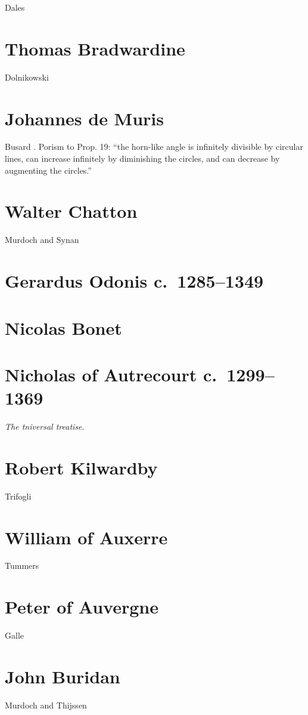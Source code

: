 \documentclass{amsart}
\theoremstyle{definition}
\begin{document}
Dales \cite{dales1984}

\section{Thomas Bradwardine}
Dolnikowski \cite{dolnikowski}


\section{Johannes de Muris}
Busard \cite[p.~35]{demuris}. Porism to Prop. 19: ``the horn-like
angle is infinitely divisible by circular lines, can increase infinitely
by diminishing the circles, and can decrease by augmenting
the circles.''

\section{Walter Chatton}
Murdoch and Synan \cite{synan}

\section{Gerardus Odonis c.~1285--1349}


\section{Nicolas Bonet}

\section{Nicholas of Autrecourt c.~1299--1369}
{\em The tniversal treatise}. 

\section{Robert Kilwardby}
Trifogli \cite{kilwardby}

\section{William of Auxerre}
Tummers \cite{tummers}

\section{Peter of Auvergne}
Galle \cite[pp.~277*--330*]{galle}

\section{John Buridan}
Murdoch and Thijssen \cite{buridan}
\end{document}
